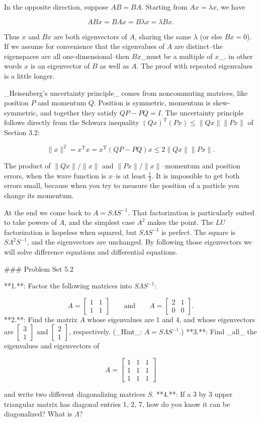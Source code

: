 In the opposite direction, suppose \(AB=BA\). Starting from \(Ax=\lambda x\), we have

\[ABx=BAx=B\lambda x=\lambda Bx.\]

Thus \(x\) and \(Bx\) are both eigenvectors of \(A\), sharing the same \(\lambda\) (or else \(Bx=0\)). If we assume for convenience that the eigenvalues of \(A\) are distinct--the eigenspaces are all one-dimensional--then \(Bx\)_must be a multiple of \(x\)_. in other words \(x\) is an eigenvector of \(B\) as well as \(A\). The proof with repeated eigenvalues is a little longer. 

_Heisenberg's uncertainty principle_ comes from noncommuting matrices, like position \(P\) and momentum \(Q\). Position is symmetric, momentum is skew-symmetric, and together they satisfy \(QP-PQ=I\). The uncertainty principle follows directly from the Schwarz inequality \((Qx)^{\mathrm{T}}(Px)\leq\|Qx\|\|Px\|\) of Section 3.2:

\[\|x\|^{2}=x^{\mathrm{T}}x=x^{\mathrm{T}}(QP-PQ)x\leq 2\|Qx\|\|Px\|.\]

The product of \(\|Qx\|/\|x\|\) and \(\|Px\|/\|x\|\)--momentum and position errors, when the wave function is \(x\)--is at least \(\frac{1}{2}\). It is impossible to get both errors small, because when you try to measure the position of a particle you change its momentum.

At the end we come back to \(A=S\Lambda S^{-1}\). That factorization is particularly suited to take powers of \(A\), and the simplest case \(A^{2}\) makes the point. The \(LU\) factorization is hopeless when squared, but \(S\Lambda S^{-1}\) is perfect. The square is \(S\Lambda^{2}S^{-1}\), and the eigenvectors are unchanged. By following those eigenvectors we will solve difference equations and differential equations.

### Problem Set 5.2

**1.**: Factor the following matrices into \(S\Lambda S^{-1}\):

\[A=\begin{bmatrix}1&1\\ 1&1\end{bmatrix}\qquad\text{and}\qquad A=\begin{bmatrix}2&1\\ 0&0\end{bmatrix}.\]
**2.**: Find the matrix \(A\) whose eigenvalues are 1 and 4, and whose eigenvectors are \(\begin{bmatrix}3\\ 1\end{bmatrix}\) and \(\begin{bmatrix}2\\ 1\end{bmatrix}\), respectively. (_Hint_: \(A=S\Lambda S^{-1}\).)
**3.**: Find _all_ the eigenvalues and eigenvectors of

\[A=\begin{bmatrix}1&1&1\\ 1&1&1\\ 1&1&1\end{bmatrix}\]

and write two different diagonalizing matrices \(S\).
**4.**: If a 3 by 3 upper triangular matrix has diagonal entries 1, 2, 7, how do you know it can be diagonalized? What is \(\Lambda\)? 
